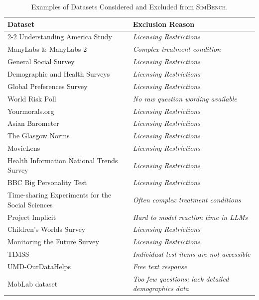 \documentclass{article} %
\begin{document}
\begin{table}[htbp]
\centering
\small
\caption{Examples of Datasets Considered and Excluded from \textsc{SimBench}.}
\label{tab:excluded_datasets}
\renewcommand{\arraystretch}{1.2} %
\begin{tabularx}{\linewidth}{@{} >{\raggedright}p{4.5cm} >{\RaggedRight}X @{}}
\toprule
\textbf{Dataset} & \textbf{Exclusion Reason} \\ 
\cmidrule(lr){2-2} %
Understanding America Study 
& \textit{Licensing Restrictions} \\
ManyLabs \& ManyLabs 2
& \textit{Complex treatment condition} \\
General Social Survey 
& \textit{Licensing Restrictions} \\
Demographic and Health Surveys
& \textit{Licensing Restrictions} \\
Global Preferences Survey
& \textit{Licensing Restrictions} \\
World Risk Poll
& \textit{No raw question wording available} \\
Yourmorals.org
& \textit{Licensing Restrictions} \\
Asian Barometer
& \textit{Licensing Restrictions} \\
The Glasgow Norms
& \textit{Licensing Restrictions} \\
MovieLens
& \textit{Licensing Restrictions} \\
Health Information National Trends Survey
& \textit{Licensing Restrictions} \\
BBC Big Personality Test
& \textit{Licensing Restrictions} \\
Time-sharing Experiments for the Social Sciences
& \textit{Often complex treatment conditions} \\
Project Implicit
& \textit{Hard to model reaction time in LLMs} \\
Children's Worlds Survey
& \textit{Licensing Restrictions} \\
Monitoring the Future Survey
& \textit{Licensing Restrictions} \\
TIMSS
& \textit{Individual test items are not accessible} \\
UMD-OurDataHelps
& \textit{Free text response} \\
MobLab dataset
& \textit{Too few questions; lack detailed demographics data} \\
\bottomrule
\end{tabularx}
\end{table}
\end{document}

